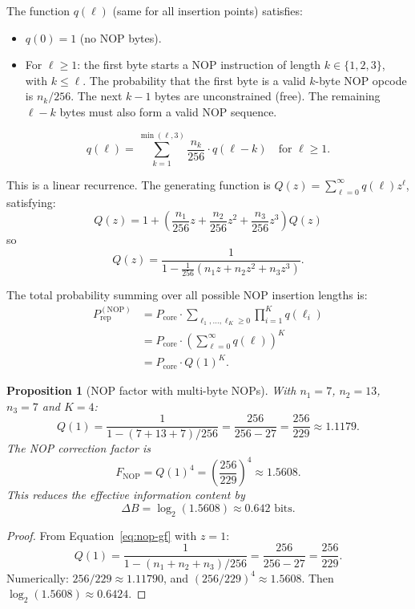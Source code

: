 \documentclass{article}
\newcommand{\Prep}{P_{\mathrm{rep}}}
\newtheorem{proposition}{Proposition}
\begin{document}
The function $q(\ell)$ (same for all insertion points) satisfies:
\begin{itemize}
\item $q(0) = 1$ (no NOP bytes).
\item For $\ell \ge 1$: the first byte starts a NOP instruction of
  length $k \in \{1, 2, 3\}$, with $k \le \ell$. The probability
  that the first byte is a valid $k$-byte NOP opcode is $n_k / 256$.
  The next $k-1$ bytes are unconstrained (free). The remaining
  $\ell - k$ bytes must also form a valid NOP sequence.
\end{itemize}

\[
  q(\ell) = \sum_{k=1}^{\min(\ell,3)} \frac{n_k}{256} \cdot q(\ell - k)
  \quad \text{for } \ell \ge 1.
\]

This is a linear recurrence. The generating function is
$Q(z) = \sum_{\ell=0}^{\infty} q(\ell) z^\ell$, satisfying:
\[
  Q(z) = 1 + \left(\frac{n_1}{256} z + \frac{n_2}{256} z^2 + \frac{n_3}{256} z^3\right) Q(z)
\]
so
\begin{equation}
  Q(z) = \frac{1}{1 - \frac{1}{256}(n_1 z + n_2 z^2 + n_3 z^3)}.
  \label{eq:nop-gf}
\end{equation}

The total probability summing over all possible NOP insertion lengths is:
\begin{align}
  \Prep^{(\mathrm{NOP})} &= P_{\mathrm{core}} \cdot \sum_{\ell_1, \ldots, \ell_K \ge 0} \prod_{i=1}^K q(\ell_i) \nonumber \\
  &= P_{\mathrm{core}} \cdot \left(\sum_{\ell=0}^{\infty} q(\ell)\right)^K \nonumber \\
  &= P_{\mathrm{core}} \cdot Q(1)^K. \label{eq:nop-total}
\end{align}

\begin{proposition}[NOP factor with multi-byte NOPs]
\label{prop:nop-multi}
With $n_1 = 7$, $n_2 = 13$, $n_3 = 7$ and $K = 4$:
\[
  Q(1) = \frac{1}{1 - (7 + 13 + 7)/256} = \frac{256}{256 - 27} = \frac{256}{229} \approx 1.1179.
\]
The NOP correction factor is
\[
  F_{\mathrm{NOP}} = Q(1)^4 = \left(\frac{256}{229}\right)^4 \approx 1.5608.
\]
This reduces the effective information content by
\[
  \Delta B = \log_2(1.5608) \approx 0.642 \text{ bits}.
\]
\end{proposition}

\begin{proof}
From Equation~\eqref{eq:nop-gf} with $z=1$:
\[
  Q(1) = \frac{1}{1 - (n_1 + n_2 + n_3)/256} = \frac{256}{256 - 27} = \frac{256}{229}.
\]
Numerically: $256/229 \approx 1.11790$, and $(256/229)^4 \approx 1.5608$.
Then $\log_2(1.5608) \approx 0.6424$.
\end{proof}
\end{document}
